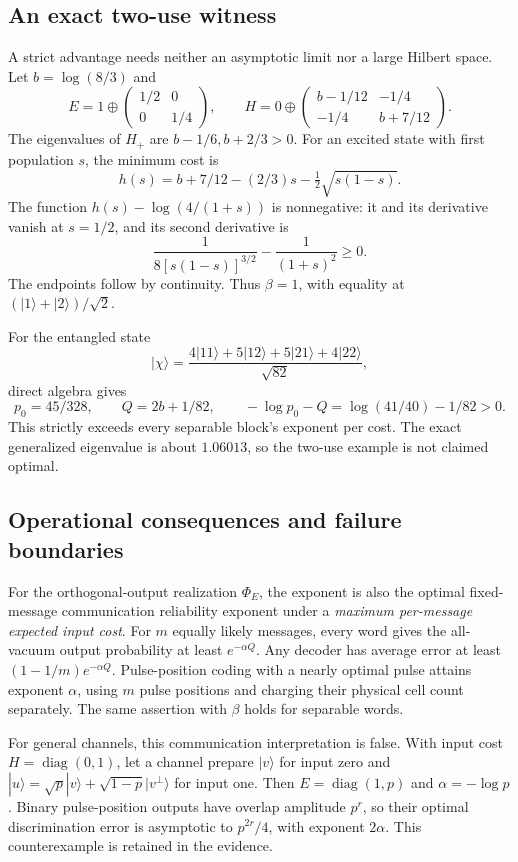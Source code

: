 \documentclass[11pt]{article}
\newcommand{\ket}[1]{|#1\rangle}
\begin{document}
\subsection{An exact two-use witness}
A strict advantage needs neither an asymptotic limit nor a large Hilbert space. Let $b=\log(8/3)$ and
\[
 E=1\oplus\begin{pmatrix}1/2&0\\0&1/4\end{pmatrix},\qquad
 H=0\oplus\begin{pmatrix}b-1/12&-1/4\\-1/4&b+7/12\end{pmatrix}.
\]
The eigenvalues of $H_+$ are $b-1/6,b+2/3>0$. For an excited state with first population $s$, the minimum cost is
\[
 h(s)=b+7/12-(2/3)s-\tfrac12\sqrt{s(1-s)}.
\]
The function $h(s)-\log(4/(1+s))$ is nonnegative: it and its derivative vanish at $s=1/2$, and its second derivative is
\[
 \frac1{8[s(1-s)]^{3/2}}-\frac1{(1+s)^2}\geq0.
\]
The endpoints follow by continuity. Thus $\beta=1$, with equality at $(\ket1+\ket2)/\sqrt2$.

For the entangled state
\[
 \ket\chi=\frac{4\ket{11}+5\ket{12}+5\ket{21}+4\ket{22}}{\sqrt{82}},
\]
direct algebra gives
\[
 p_0=45/328,\qquad Q=2b+1/82,\qquad
 -\log p_0-Q=\log(41/40)-1/82>0.
\]
This strictly exceeds every separable block's exponent per cost. The exact generalized eigenvalue is about $1.06013$, so the two-use example is not claimed optimal.

\subsection{Operational consequences and failure boundaries}
For the orthogonal-output realization $\Phi_E$, the exponent is also the optimal fixed-message communication reliability exponent under a \emph{maximum per-message expected input cost}. For $m$ equally likely messages, every word gives the all-vacuum output probability at least $e^{-\alpha Q}$. Any decoder has average error at least $(1-1/m)e^{-\alpha Q}$. Pulse-position coding with a nearly optimal pulse attains exponent $\alpha$, using $m$ pulse positions and charging their physical cell count separately. The same assertion with $\beta$ holds for separable words.

For general channels, this communication interpretation is false. With input cost $H=\operatorname{diag}(0,1)$, let a channel prepare $\ket v$ for input zero and $\ket u=\sqrt p\ket v+\sqrt{1-p}\ket{v^\perp}$ for input one. Then $E=\operatorname{diag}(1,p)$ and $\alpha=-\log p$. Binary pulse-position outputs have overlap amplitude $p^r$, so their optimal discrimination error is asymptotic to $p^{2r}/4$, with exponent $2\alpha$. This counterexample is retained in the evidence.
\end{document}
